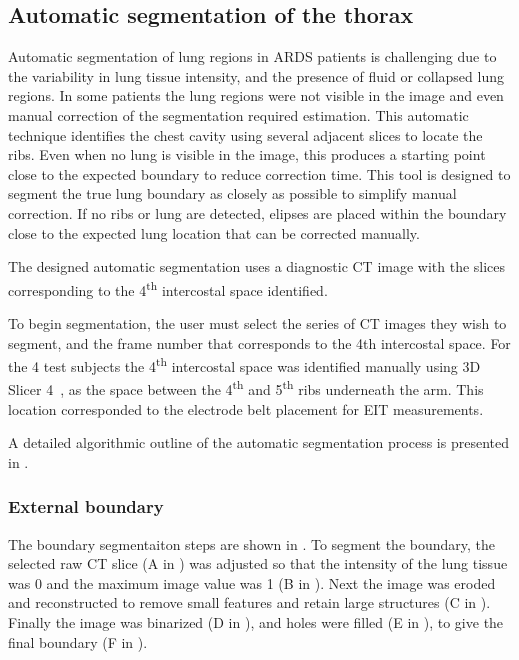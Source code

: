 \subsection{Automatic segmentation of the thorax} \label{sec:auto-segment}
Automatic segmentation of lung regions in ARDS patients is challenging due to the variability
in lung tissue intensity, and the presence of fluid or collapsed lung regions. 
In some patients the lung regions were not visible in the image and even manual
correction of the segmentation required estimation. 
This automatic technique identifies the chest cavity using several adjacent slices to
locate the ribs.
Even when no lung is visible in the image, this produces a starting point
close to the expected boundary to reduce correction time. 
This tool is designed to segment the true lung boundary as closely as possible to 
simplify manual correction.
If no ribs or lung are detected, elipses are placed within the boundary 
close to the expected lung location that 
can be corrected manually.

The designed automatic segmentation uses a diagnostic CT image 
with the slices corresponding to the 4\textsuperscript{th} intercostal space 
identified. 

To begin segmentation, the user must select the series of CT images they 
wish to segment, and the frame number that corresponds to the 4th intercostal 
space. For the 4 test subjects the 4\textsuperscript{th} 
intercostal space was identified manually using
3D Slicer 4~\parencite{fedorov_3d_2012}, as the space between the
4\textsuperscript{th} and 5\textsuperscript{th} ribs underneath the arm.
This location corresponded to the electrode belt placement for EIT measurements.

A detailed algorithmic outline of the automatic segmentation process is 
presented in .

\subsubsection{External boundary} \label{sec:ext_seg}
The boundary segmentaiton steps are shown in .
To segment the boundary, the selected raw CT slice 
(A in ) 
was adjusted so that the
intensity of the lung tissue was 0 and the maximum image value was 1 
(B in ). 
Next the image was eroded and reconstructed 
to remove small features and retain large structures 
(C in ).
Finally the image was binarized (D in ),
and holes were filled (E in ), 
to give the final boundary (F in ).


